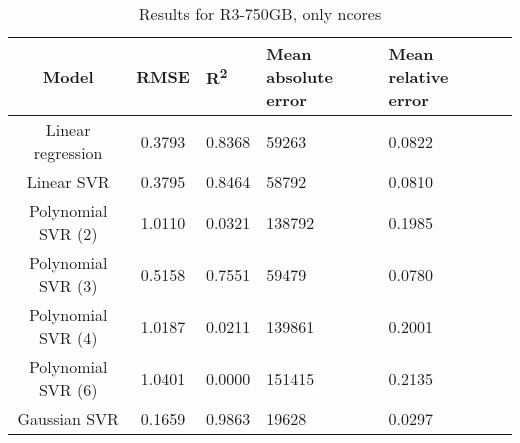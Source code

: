 \begin{table}[H]
\centering
\begin{adjustbox}{center}
\begin{tabular}{c | c M{1.2cm} M{2.5cm} M{2.5cm} M{1.8cm}}
Model & RMSE & R\textsuperscript{2} & Mean absolute error & Mean relative error \tabularnewline
\hline
Linear regression & 0.3793 & 0.8368 &  59263 & 0.0822 \\
Linear SVR & 0.3795 & 0.8464 &  58792 & 0.0810 \\
Polynomial SVR (2) & 1.0110 & 0.0321 & 138792 & 0.1985 \\
Polynomial SVR (3) & 0.5158 & 0.7551 &  59479 & 0.0780 \\
Polynomial SVR (4) & 1.0187 & 0.0211 & 139861 & 0.2001 \\
Polynomial SVR (6) & 1.0401 & 0.0000 & 151415 & 0.2135 \\
Gaussian SVR & 0.1659 & 0.9863 &  19628 & 0.0297 \\
\end{tabular}
\end{adjustbox}
\\
\caption{Results for R3-750GB, only ncores}
\label{tab:only_1_linear_R3_750}
\end{table}
